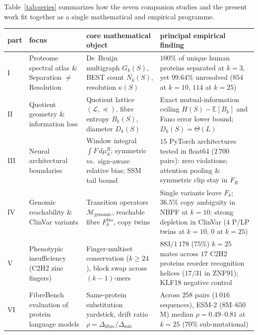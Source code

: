 \documentclass[11pt]{article}
\theoremstyle{plain}
\theoremstyle{definition}
\theoremstyle{remark}
\begin{document}
Table~\ref{tab:series} summarizes how the seven companion studies and the present work fit together as a single
mathematical and empirical programme.

\begin{table}[t]
\centering\footnotesize\setlength{\tabcolsep}{4pt}
\renewcommand{\arraystretch}{1.15}
\begin{tabular}{>{\raggedright\arraybackslash}p{}>{\raggedright\arraybackslash}p{}>{\raggedright\arraybackslash}p{}>{\raggedright\arraybackslash}p{}}
\toprule
part & focus & core mathematical object & principal empirical finding\\
\midrule
I \cite{CC26a,CC26b} & Proteome spectral atlas \& Separation $\ne$ Resolution & De~Bruijn multigraph $G_k(S)$, BEST count $N_k(S)$, resolution $\kappa(S)$ & $100\%$ of unique human proteins separated at $k=3$, yet $99.64\%$ unresolved ($854$ at $k=10$, $114$ at $k=25$)\\
II \cite{CC26c} & Quotient geometry \& information loss & Quotient lattice $(\mathcal L,\preceq)$, fibre entropy $B_k(S)$, diameter $D_k(S)$ & Exact mutual-information ceiling $H(S)-\mathbb E[B_k]$ and Fano error lower bound; $D_k(S)=\Theta(L)$\\
III \cite{CC26d} & Neural architectural boundaries & Window integral $\int F\,d\mu_S^R$; symmetric vs.\ sign-aware relative bias; SSM tail bound & $15$ PyTorch architectures tested in float64 ($2\,700$ pairs): zero violations; attention pooling \& symmetric clip stay in $F_R$\\
IV \cite{CC26e} & Genomic reachability \& ClinVar variants & Transition operators $\mathcal M_{\mathrm{genomic}}$, reachable fibre $F_k^{\mathrm{bio}}$, copy twins & Single variants leave $F_k$; $36.5\%$ copy ambiguity in NBPF at $k=10$; strong depletion in ClinVar ($4$ P/LP twins at $k=10$, $0$ at $k=25$)\\
V \cite{CC26f} & Phenotypic insufficiency (C2H2 zinc fingers) & Finger-multiset conservation ($k\ge24$), block swap across $(k-1)$-mers & $883/1\,178$ ($75\%$) $k=25$ mates across $17$ C2H2 proteins reorder recognition helices ($17/31$ in ZNF91); KLF18 negative control\\
VI \cite{CC26g} & FibreBench evaluation of protein language models & Same-protein substitution yardstick, drift ratio $\rho=\Delta_{\mathrm{fibre}}/\Delta_{\mathrm{sub}}$ & Across $258$ pairs ($1\,016$ sequences), ESM-2 ($8$M--$650$M) median $\rho=0.49$--$0.81$ at $k=25$ ($70\%$ sub-mutational)\\

\end{tabular}
\end{table}
\end{document}

